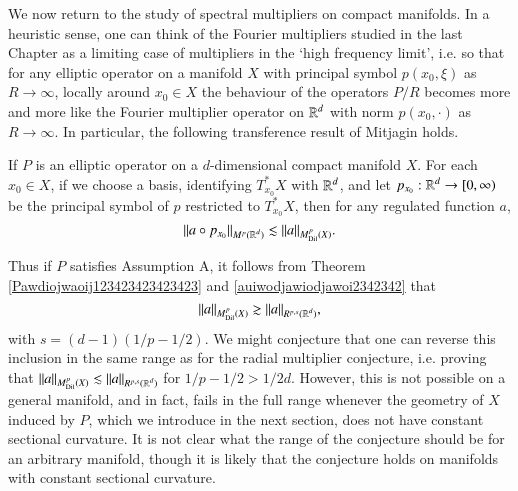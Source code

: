 We now return to the study of spectral multipliers on compact manifolds. In a heuristic sense, one can think of the Fourier multipliers studied in the last Chapter as a limiting case of multipliers in the `high frequency limit', i.e. so that for any elliptic operator on a manifold $X$ with principal symbol $p(x_0,\xi)$ as $R \to \infty$, locally around $x_0 \in X$ the behaviour of the operators $P/R$ becomes more and more like the Fourier multiplier operator on $\operatorname{\mathbb{R}}^d$ with norm $p(x_0,\cdot)$ as $R \to \infty$. In particular, the following transference result of Mitjagin \cite{Mitjagin} holds.

\begin{theorem} \label{Pawdiojwaoij123423423423423}
  If $P$ is an elliptic operator on a $d$-dimensional compact manifold $X$. For each $x_0 \in X$, if we choose a basis, identifying $T_{x_0}^* X$ with $\operatorname{\mathbb{R}}^d$, and let $p_{x_0}: \operatorname{\mathbb{R}}^d \to [0,\infty)$ be the principal symbol of $p$ restricted to $T_{x_0}^* X$, then for any regulated function $a$,
  \[ \| a \circ p_{x_0} \|_{M^p(\operatorname{\mathbb{R}}^d)} \lesssim \| a \|_{M^p_{\text{Dil}}(X)}. \]
\end{theorem}

Thus if $P$ satisfies Assumption A, it follows from Theorem \ref{Pawdiojwaoij123423423423423} and \eqref{auiwodjawiodjawoi2342342} that
%
\begin{equation} \label{upperboundawdoiwjdoawi}
  \| a \|_{M^p_{\text{Dil}}(X)} \gtrsim \| a \|_{R^{p,s}(\operatorname{\mathbb{R}}^d)},
\end{equation}
%
with $s = (d-1)(1/p - 1/2)$. We might conjecture that one can reverse this inclusion in the same range as for the radial multiplier conjecture, i.e. proving that $\| a \|_{M^p_{\text{Dil}}(X)} \lesssim \| a \|_{R^{p,s}(\operatorname{\mathbb{R}}^d)}$ for $1/p - 1/2 > 1/2d$. However, this is not possible on a general manifold, and in fact, fails in the full range whenever the geometry of $X$ induced by $P$, which we introduce in the next section, does not have constant sectional curvature. It is not clear what the range of the conjecture should be for an arbitrary manifold, though it is likely that the conjecture holds on manifolds with constant sectional curvature.

